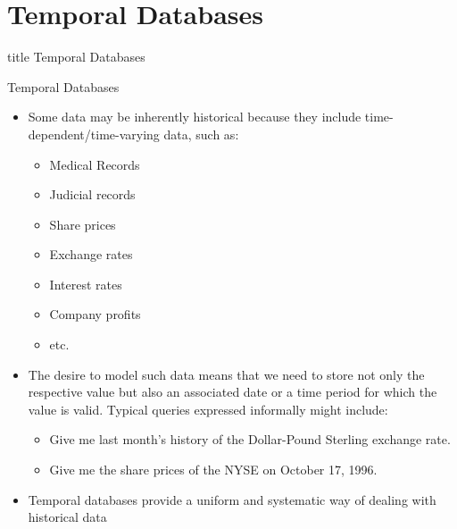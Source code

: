 \documentclass[aspectratio=169, xcolor=dvipsnames]{beamer}
\begin{document}
\section{Temporal Databases}
\begin{frame}
  \vfill
  \centering
  \begin{beamercolorbox}[sep=8pt,center,shadow=true,rounded=true]{title}
    Temporal Databases\par%
  \end{beamercolorbox}
  \vfill
\end{frame}

\begin{frame}{Temporal Databases}
    \begin{itemize}[<+->]
        \item Some data may be inherently historical because they include time-dependent/time-varying data, such as:
        \begin{itemize}
            \item[$\triangleright$] Medical Records
            \item[$\triangleright$] Judicial records
            \item[$\triangleright$] Share prices
            \item[$\triangleright$] Exchange rates
            \item[$\triangleright$] Interest rates
            \item[$\triangleright$] Company profits
            \item[$\triangleright$] etc.
        \end{itemize}
        \item The desire to model such data means that we need to store not only the respective value but also an associated date or a time period for which the value is valid. Typical queries expressed informally might include:
        \begin{itemize}
            \item[$\triangleright$] Give me last month's history of the Dollar-Pound Sterling exchange rate.
            \item[$\triangleright$] Give me the share prices of the NYSE on October 17, 1996.
        \end{itemize}
        \item Temporal databases provide a uniform and systematic way of dealing with historical data
    \end{itemize}
\end{frame}
\end{document}
